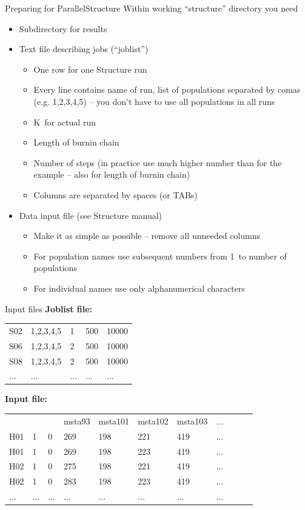 \documentclass[compress, ucs, xelatex, 11pt, xcolor=svgnames,
  hyperref={
    bookmarks=true,
    unicode=true,
    colorlinks=true,
    pdftitle={Molecular data in R},
    plainpages=false,
    pdfauthor={Vojtech Zeisek},
    pdfsubject={Course about phylogeny and evolution in R},
    pdfcreator={XeLaTeX},
    pdfkeywords={R, evolution, phylogeny, molecular data},
    linkcolor=Tomato,
    anchorcolor=SaddleBrown,
    citecolor=Goldenrod,
    filecolor=DarkMagenta,
    menucolor=Sienna,
    urlcolor=DarkTurquoise,
    pdftex},
  url={hyphens, lowtilde} %
  ]{beamer}
\begin{document}
\begin{frame}{Preparing for ParallelStructure}
  Within working ``structure'' directory you need
  \begin{itemize}
    \item Subdirectory for results
    \item Text file describing jobs (``joblist'')
      \begin{itemize}
	\item One row for one Structure run
	\item Every line contains name of run, list of populations separated by comas (e.g. 1,2,3,4,5) -- you don't have to use all populations in all runs
	\item K~for actual run
	\item Length of burnin chain
	\item Number of steps (in practice use much higher number than for the example -- also for length of burnin chain)
	\item Columns are separated by spaces (or TABs)
      \end{itemize}
    \item Data input file (see Structure manual)
      \begin{itemize}
	\item Make it as simple as possible -- remove all unneeded columns
	\item For population names use subsequent numbers from 1~to number of populations
	\item For individual names use only alphanumerical characters
    \end{itemize}
  \end{itemize}
\end{frame}

\begin{frame}[fragile]{Input files}
  \vfil
  \textbf{Joblist file:}
  \vfil
  \begin{tabular}{lllll}
    S02 & 1,2,3,4,5 & 1 & 500 & 10000\\
    S06 & 1,2,3,4,5 & 2 & 500 & 10000\\
    S08 & 1,2,3,4,5 & 2 & 500 & 10000\\
    ... & ... & ... & ... & ...
  \end{tabular}
  \vfill
  \textbf{Input file:}
  \vfil
  \begin{tabular}{lllllllllll}
    & & & msta93 & msta101 & msta102 & msta103 & ...\\
    H01 & 1 & 0 & 269 & 198 & 221 & 419 & ...\\
    H01 & 1 & 0 & 269 & 198 & 223 & 419 & ...\\
    H02 & 1 & 0 & 275 & 198 & 221 & 419 & ...\\
    H02 & 1 & 0 & 283 & 198 & 223 & 419 & ...\\
    ... & ... & ... & ... & ... & ... & ... & ...
  \end{tabular}
  \vfil
\end{frame}
\end{document}
